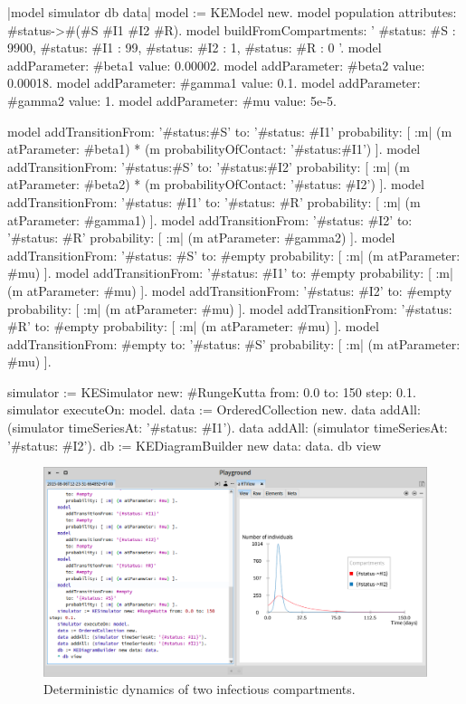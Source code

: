 \documentclass[a4paper,10pt,twoside]{book}
\begin{document}
\begin{code}{}
|model simulator db data|
	model := KEModel new.
	model population attributes: {#status->#(#S #I1 #I2 #R)}.
	model buildFromCompartments: '{
		{ #status: #S }: 9900,
		{ #status: #I1 }: 99,
		{ #status: #I2 }: 1,
		{ #status: #R }: 0
	}'.
	model addParameter: #beta1 value: 0.00002.
	model addParameter: #beta2 value: 0.00018.
	model addParameter: #gamma1 value: 0.1.
	model addParameter: #gamma2 value: 1.
	model addParameter: #mu value: 5e-5.

	model
		addTransitionFrom: '{#status:#S}'
		to: '{#status: #I1}'
		probability: [ :m| (m atParameter: #beta1) * (m probabilityOfContact: '{#status:#I1}') ].
	model
		addTransitionFrom: '{#status:#S}'
		to: '{#status:#I2}'
		probability: [ :m| (m atParameter: #beta2) * (m probabilityOfContact: '{#status: #I2}') ].
	model
		addTransitionFrom: '{#status: #I1}'
		to: '{#status: #R}'
		probability: [ :m| (m atParameter: #gamma1) ].
	model
		addTransitionFrom: '{#status: #I2}'
		to: '{#status: #R}'
		probability: [ :m| (m atParameter: #gamma2) ].
	model
		addTransitionFrom: '{#status: #S}'
		to: #empty
		probability: [ :m| (m atParameter: #mu) ].
	model
		addTransitionFrom: '{#status: #I1}'
		to: #empty
		probability: [ :m| (m atParameter: #mu) ].
	model
		addTransitionFrom: '{#status: #I2}'
		to: #empty
		probability: [ :m| (m atParameter: #mu) ].
	model
		addTransitionFrom: '{#status: #R}'
		to: #empty
		probability: [ :m| (m atParameter: #mu) ].
	model
		addTransitionFrom: #empty
		to: '{#status: #S}'
		probability: [ :m| (m atParameter: #mu) ].

	simulator := KESimulator new: #RungeKutta from: 0.0 to: 150 step: 0.1.
	simulator executeOn: model.
	data := OrderedCollection new.
	data addAll: (simulator timeSeriesAt: '{#status: #I1}').
	data addAll: (simulator timeSeriesAt: '{#status: #I2}').
	db := KEDiagramBuilder new data: data.
	db view
\end{code}



\begin{figure}

\begin{center}
\includegraphics[width=1.0\textwidth]{figures/Multi_Strain_RK4.png}\caption{Deterministic dynamics of two infectious compartments.\label{Multi_Strain_RK4}}\end{center}
\end{figure}
\end{document}
